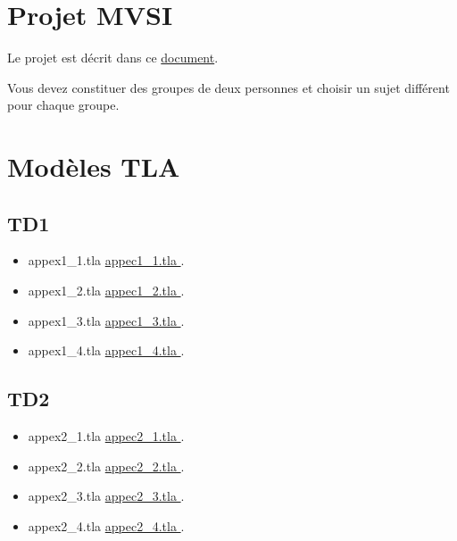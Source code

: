 \documentclass[ 12pt]{article}
\begin{document}
\begin{tcolorbox}
  
  \section{Projet MVSI}
\label{sec:project}

Le  projet est décrit   dans ce     \href{http://mery54.github.io/teaching/mvsi/lecturesnotes/projet2024.pdf}{document}.

Vous devez  constituer des groupes de deux personnes   et choisir un
sujet  différent pour chaque groupe.




  \section{Modèles TLA}
\label{sec:event-b-models}


\subsection{TD1}

 \begin{itemize}
  \item[]   appex1\_1.tla 
    \href{http://mery54.github.io/teaching/mvsi/models/appex1_1.tla}{
      appec1\_1.tla }.
      \item[]   appex1\_2.tla 
    \href{http://mery54.github.io/teaching/mvsi/models/appex1_2.tla}{
      appec1\_2.tla }.
       \item[]   appex1\_3.tla 
    \href{http://mery54.github.io/teaching/mvsi/models/appex1_3.tla}{
      appec1\_3.tla }.
          \item[]   appex1\_4.tla 
    \href{http://mery54.github.io/teaching/mvsi/models/appex1_4.tla}{
      appec1\_4.tla }.
  \end{itemize}

  
\subsection{TD2}
    
 \begin{itemize}
  \item[]   appex2\_1.tla 
    \href{http://mery54.github.io/teaching/mvsi/models/appex2_1.tla}{
      appec2\_1.tla }.
      \item[]   appex2\_2.tla 
    \href{http://mery54.github.io/teaching/mvsi/models/appex2_2.tla}{
      appec2\_2.tla }.
       \item[]   appex2\_3.tla 
    \href{http://mery54.github.io/teaching/mvsi/models/appex2_3.tla}{
      appec2\_3.tla }.
          \item[]   appex2\_4.tla 
    \href{http://mery54.github.io/teaching/mvsi/models/appex2_4.tla}{
      appec2\_4.tla }.
  \end{itemize}


\end{tcolorbox}
\end{document}

